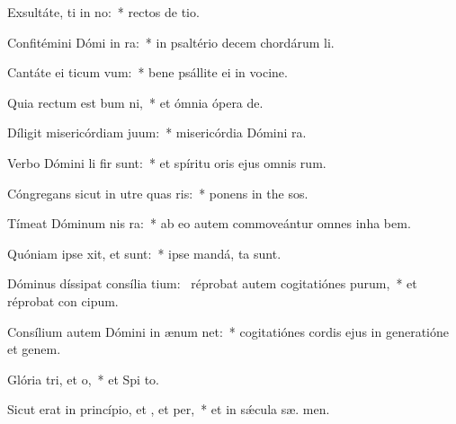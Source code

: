 \item Exsultáte, ti in no:~* rectos de tio.
\item Confitémini Dómi in ra:~* in psaltério decem chordárum  li.
\item Cantáte ei ticum vum:~* bene psállite ei in vocine.
\item Quia rectum est bum ni,~* et ómnia ópera   de.
\item Díligit misericórdiam  juum:~* misericórdia Dómini   ra.
\item Verbo Dómini li fir sunt:~* et spíritu oris ejus omnis  rum.
\item Cóngregans sicut in utre quas ris:~* ponens in the sos.
\item Tímeat Dóminum nis ra:~* ab eo autem commoveántur omnes inha bem.
\item Quóniam ipse xit, et  sunt:~* ipse mandá,  ta sunt.
\item Dóminus díssipat consília tium:~\pscross{} réprobat autem cogitatiónes purum,~* et réprobat con cipum.
\item Consílium autem Dómini in ænum net:~* cogitatiónes cordis ejus in generatióne et genem.
\item Glória tri, et o,~* et Spi to.
\item Sicut erat in princípio, et , et per,~* et in sǽcula sæ. men.
